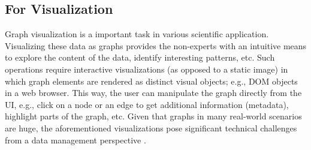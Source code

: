 \subsection{For  Visualization}
Graph visualization is a important task in various scientific application. Visualizing these data
as graphs provides the non-experts with an intuitive means
to explore the content of the data, identify interesting patterns,
etc. Such operations require interactive visualizations
(as opposed to a static image) in which graph elements are
rendered as distinct visual objects; e.g., DOM objects in a
web browser. This way, the user can manipulate the graph
directly from the UI, e.g., click on a node or an edge to
get additional information (metadata), highlight parts of the
graph, etc. Given that graphs in many real-world scenarios
are huge, the aforementioned visualizations pose significant
technical challenges from a data management perspective \cite{graphviz}.

